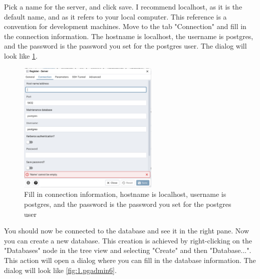 

Pick a name for the server, and click save. I recommend localhost, as it is the default name, and as it refers to your local computer. This reference is a convention for development machines. 
Move to the tab "Connection" and fill in the connection information. The hostname is localhost, the username is postgres, and the password is the password you set for the postgres user. The dialog will look like \cref{fig:1.pgadmin4}.

\begin{figure}[H]
    \centering
    \includegraphics[width=0.6\textwidth]{content/1-relational-databases/figures/pgadmin/4.png}
    \caption{Fill in connection information, hostname is localhost, username is postgres, and the password is the password you set for the postgres user}
    \label{fig:1.pgadmin4}
\end{figure}


You should now be connected to the database and see it in the right pane.
Now you can create a new database. This creation is achieved by right-clicking on the "Databases" node in the tree view and selecting "Create" and then "Database...". This action will open a dialog where you can fill in the database information. The dialog will look like \cref{fig:1.pgadmin6}.

